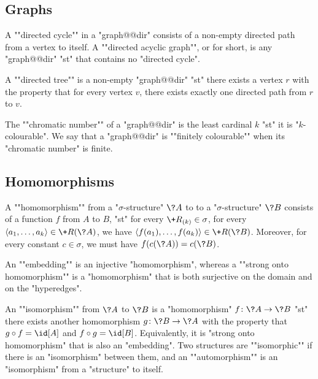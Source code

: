 \subsection{Graphs}

A \AP""directed cycle"" in a "graph@@dir" consists
of a non-empty directed path from a vertex to itself.
A ""directed acyclic graph"", or  for short,
is any "graph@@dir" "st" that contains no "directed cycle".

A ""directed tree"" is a non-empty "graph@@dir" "st" there exists 
a vertex $r$ with the property that for every vertex $v$,
there exists exactly one directed path from $r$ to $v$.

The ""chromatic number"" of a "graph@@dir" is the least cardinal $k$
"st" it is "$k$-colourable". We say that a "graph@@dir"
is \AP""finitely colourable"" when its "chromatic number" is finite.


\subsection{Homomorphisms}

A \AP""homomorphism"" from a "$\sigma$-structure" $\?A$ to
to a "$\sigma$-structure" $\?B$ consists of a function $f$ from $A$ to $B$,
"st" for every $\+R_{(k)} \in \sigma$, for every $\tup{a_1,\dotsc,a_k} \in \+R(\?A)$,
we have $\tup{f(a_1), \dotsc, f(a_k)} \in \+R(\?B)$. Moreover, for every
constant $c \in \sigma$, we must have $f(c(\?A)) = c(\?B)$.

An \AP""embedding"" is an injective "homomorphism",
whereas a \AP""strong onto homomorphism"" is a "homomorphism" that is both
surjective on the domain and on the "hyperedges". 

An \AP""isomorphism"" from $\?A$ to $\?B$ is a "homomorphism" $f\colon \?A \to \?B$
"st" there exists another homomorphism $g\colon \?B \to \?A$ with the property
that $g \circ f = \id[A]$ and $f \circ g = \id[B]$. Equivalently,
it is "strong onto homomorphism" that is also an "embedding".
Two structures are \AP""isomorphic"" if there is an "isomorphism" between them,
and an ""automorphism"" is an "isomorphism" from a "structure" to itself.

